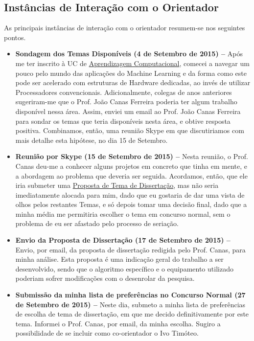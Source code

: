 \documentclass[a4paper, onecolumn, 10pt]{article}
\begin{document}
	\subsection{Instâncias de Interação com o Orientador}
	As principais instâncias de interação com o orientador resumem-se nos seguintes pontos.
	\begin{itemize}
		\item
			\textbf{Sondagem dos Temas Disponíveis (4 de Setembro de 2015) --} Após me ter inscrito à UC de \href{https://sigarra.up.pt/feup/pt/ucurr_geral.ficha_uc_view?pv_ocorrencia_id=374787}{Aprendizagem Computacional}, comecei a navegar um pouco pelo mundo das aplicações do Machine Learning e da forma como este pode ser acelerado com estruturas de Hardware dedicadas, ao invés de utilizar Processadores convencionais. Adicionalmente, colegas de anos anteriores sugeriram-me que o Prof. João Canas Ferreira poderia ter algum trabalho disponível nessa área. Assim, enviei um email ao Prof. João Canas Ferreira para sondar os temas que teria disponíveis nesta área, e obtive resposta positiva. Combinamos, então, uma reunião Skype em que discutiriamos com mais detalhe esta hipótese, no dia 15 de Setembro.

		\item
			\textbf{Reunião por Skype (15 de Setembro de 2015) --} Nesta reunião, o Prof. Canas deu-me a conhecer alguns projetos em concreto que tinha em mente, e a abordagem ao problema que deveria ser seguida. Acordamos, então, que ele iria submeter uma \href{https://sigarra.up.pt/feup/pt/estagios_empresas.ver_dados_proposta?p_id=191431&pv_perfil=ALU&p_aluno_id=116261}{Proposta de Tema de Dissertação}, mas não seria imediatamente alocada para mim, dado que eu gostaria de dar uma vista de olhos pelos restantes Temas, e só depois tomar uma decisão final, dado que a minha média me permitiria escolher o tema em concurso normal, sem o problema de eu ser afastado pelo processo de seriação.

		\item
			\textbf{Envio da Proposta de Dissertação (17 de Setembro de 2015) --} Envio, por email, da proposta de dissertação redigida pelo Prof. Canas, para minha análise. Esta proposta é uma indicação geral do trabalho a ser desenvolvido, sendo que o algoritmo específico e o equipamento utilizado poderiam sofrer modificações com o desenrolar da pesquisa.

		\item
			\textbf{Submissão da minha lista de preferências no Concurso Normal (27 de Setembro de 2015) --} Neste dia, submeto a minha lista de preferências de escolha de tema de dissertação, em que me decido definitivamente por este tema. Informei o Prof. Canas, por email, da minha escolha. Sugiro a possibilidade de se incluir como co-orientador o Ivo Timóteo.


\end{itemize}
\end{document}

